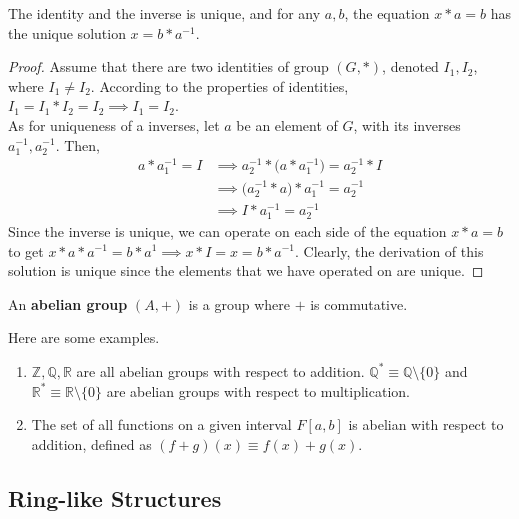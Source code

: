 \documentclass{article}
\begin{document}
    \begin{proposition}
      The identity and the inverse is unique, and for any $a, b$, the equation $x*a = b$ has the unique solution $x = b* a^{-1}$.
    \end{proposition}
    \begin{proof}
       Assume that there are two identities of group $(G,*)$, denoted $I_{1}, I_{2}$, where $I_{1} \neq I_{2}$. According to the properties of identities, $I_{1} = I_{1} * I_{2} = I_{2} \implies I_{1} = I_{2}$. \\
      As for uniqueness of a inverses, let $a$ be an element of $G$, with its inverses $a_{1}^{-1}, a_{2}^{-1}$. Then, 
      \begin{align*}
        a * a_{1}^{-1} = I & \implies a_{2}^{-1} * \Big(a * a_{1}^{-1} \Big)= a_{2}^{-1} * I \\
         & \implies \Big(a_{2}^{-1} * a \Big) * a_{1}^{-1} = a_{2}^{-1} \\
         & \implies I * a_{1}^{-1} = a_{2}^{-1}
      \end{align*}
      Since the inverse is unique, we can operate on each side of the equation $x*a = b$ to get $x*a*a^{-1} = b*a^{1} \implies x * I = x = b*a^{-1}$. Clearly, the derivation of this solution is unique since the elements that we have operated on are unique.
    \end{proof}

    \begin{definition}
      An \textbf{abelian group} $(A, +)$ is a group where $+$ is commutative. 
    \end{definition}

    \begin{example}
      Here are some examples. 
      \begin{enumerate}
        \item $\mathbb{Z}, \mathbb{Q}, \mathbb{R}$ are all abelian groups with respect to addition. $\mathbb{Q}^{*} \equiv \mathbb{Q} \setminus \{0\}$ and $\mathbb{R}^{*} \equiv \mathbb{R} \setminus \{0\}$ are abelian groups with respect to multiplication.
        \item The set of all functions on a given interval $F[a,b]$ is abelian with respect to addition, defined as $(f+g)(x) \equiv f(x) + g(x)$. 
      \end{enumerate}
    \end{example}

  \subsection{Ring-like Structures}
\end{document}
